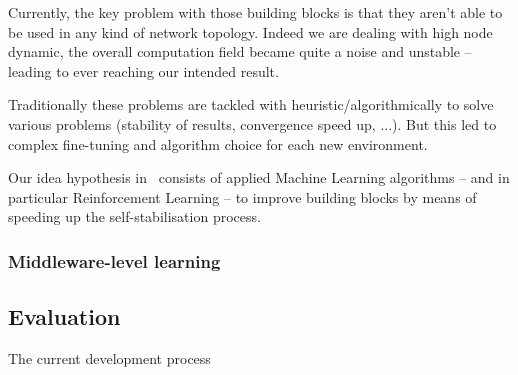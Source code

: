 \documentclass[11pt]{article}
\begin{document}
Currently, the key problem with those building blocks is that they aren't able to be used in any kind of network topology. Indeed we are dealing with high node dynamic, the overall computation field became quite a noise and unstable -- leading to ever reaching our intended result.

Traditionally these problems are tackled with heuristic/algorithmically to solve various problems (stability of results, convergence speed up, ...). But this led to complex fine-tuning and algorithm choice for each new environment.

Our idea hypothesis in~\cite{research} consists of applied Machine Learning algorithms -- and in particular Reinforcement Learning -- to improve building blocks by means of speeding up the self-stabilisation process.
\subsubsection{Middleware-level learning}
\subsection{Evaluation}\label{evaluation}
The current development process



\end{document}
